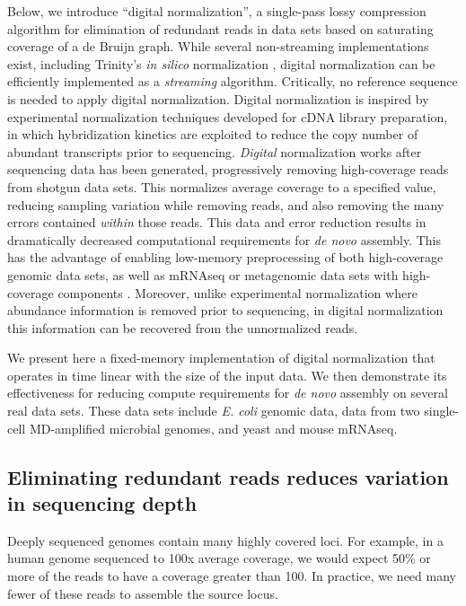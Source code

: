 Below, we introduce ``digital normalization'', a single-pass lossy compression
algorithm for elimination of redundant reads in data sets based on saturating
coverage of a de Bruijn graph.   While several non-streaming implementations
exist, including Trinity's {\em in silico} normalization
\cite{Haas2013,Brown2012blog}, digital normalization can be efficiently
implemented as a {\em streaming} algorithm.  Critically, no reference sequence
is needed to apply digital normalization.  Digital normalization is inspired by
experimental normalization techniques developed for cDNA library preparation,
in which hybridization kinetics are exploited to reduce the copy number of
abundant transcripts prior to sequencing\cite{pubmed8889548,pubmed7937745}.
{\em Digital} normalization works after sequencing data has been generated,
progressively removing high-coverage reads from shotgun data sets.  This
normalizes average coverage to a specified value, reducing sampling variation
while removing reads, and also removing the many errors contained {\em within}
those reads.  This data and error reduction results in dramatically decreased
computational requirements for {\em de novo} assembly.  This has the advantage
of enabling low-memory preprocessing of both high-coverage genomic data sets,
as well as mRNAseq or metagenomic data sets with high-coverage components
\cite{Brown2012, Howe2012}. Moreover, unlike experimental normalization where
abundance information is removed prior to sequencing, in digital normalization
this information can be recovered from the unnormalized reads.

We present here a fixed-memory implementation of digital normalization that
operates in time linear with the size of the input data.  We then demonstrate
its effectiveness for reducing compute requirements for {\em de novo} assembly
on several real data sets.  These data sets include {\em E. coli} genomic data,
data from two single-cell MD-amplified microbial genomes, and yeast and mouse
mRNAseq.

\subsection{Eliminating redundant reads reduces variation in sequencing depth}

Deeply sequenced genomes contain many highly covered loci.  For example, in a
human genome sequenced to 100x average coverage, we would expect 50\% or more
of the reads to have a coverage greater than 100. In practice, we need many
fewer of these reads to assemble the source locus.

